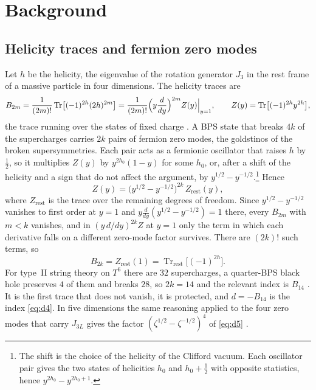 \documentclass[11pt]{amsart}
\theoremstyle{definition}
\begin{document}
\section{Background}\label{sec:background}

\subsection{Helicity traces and fermion zero modes}\label{ssec:helicity}
Let $h$ be the helicity, the eigenvalue of the rotation generator $J_3$ in the rest frame of a massive particle in four dimensions. The helicity traces are
\[
B_{2m}=\frac{1}{(2m)!}\operatorname{Tr}\bigl[(-1)^{2h}(2h)^{2m}\bigr]=\frac1{(2m)!}\Bigl(y\frac{d}{dy}\Bigr)^{2m}Z(y)\Big|_{y=1},\qquad Z(y)=\operatorname{Tr}\bigl[(-1)^{2h}y^{2h}\bigr],
\]
the trace running over the states of fixed charge \cite{BK97,BFKOV98,KO97}. A BPS state that breaks $4k$ of the supercharges carries $2k$ pairs of fermion zero modes, the goldstinos of the broken supersymmetries. Each pair acts as a fermionic oscillator that raises $h$ by $\frac12$, so it multiplies $Z(y)$ by $y^{2h_0}(1-y)$ for some $h_0$, or, after a shift of the helicity and a sign that do not affect the argument, by $y^{1/2}-y^{-1/2}$.\footnote{The shift is the choice of the helicity of the Clifford vacuum. Each oscillator pair gives the two states of helicities $h_0$ and $h_0+\frac12$ with opposite statistics, hence $y^{2h_0}-y^{2h_0+1}$.} Hence
\[
Z(y)=\bigl(y^{1/2}-y^{-1/2}\bigr)^{2k}\,Z_{\mathrm{rest}}(y),
\]
where $Z_{\mathrm{rest}}$ is the trace over the remaining degrees of freedom. Since $y^{1/2}-y^{-1/2}$ vanishes to first order at $y=1$ and $y\frac{d}{dy}(y^{1/2}-y^{-1/2})=1$ there, every $B_{2m}$ with $m<k$ vanishes, and in $(y\,d/dy)^{2k}Z$ at $y=1$ only the term in which each derivative falls on a different zero-mode factor survives. There are $(2k)!$ such terms, so
\[
B_{2k}=Z_{\mathrm{rest}}(1)=\operatorname{Tr}_{\mathrm{rest}}\bigl[(-1)^{2h}\bigr].
\]
For type~II string theory on $T^6$ there are $32$ supercharges, a quarter-BPS black hole preserves $4$ of them and breaks $28$, so $2k=14$ and the relevant index is $B_{14}$ \cite{Sen08r,Sen10}. It is the first trace that does not vanish, it is protected, and $d=-B_{14}$ is the index \eqref{eq:d4}. In five dimensions the same reasoning applied to the four zero modes that carry $J_{3L}$ gives the factor $(\zeta^{1/2}-\zeta^{-1/2})^4$ of \eqref{eq:d5} \cite[\S5.3]{DGMS11}.
\end{document}

